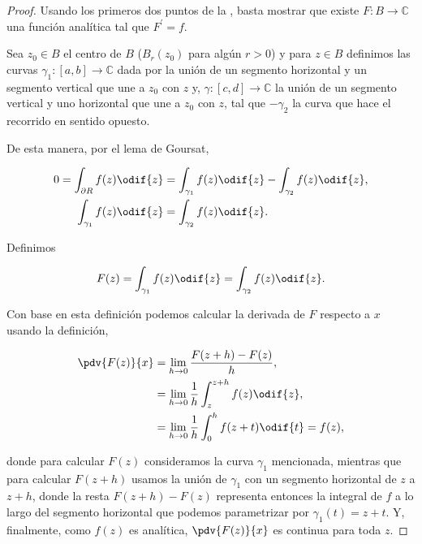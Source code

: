 \documentclass[../main.tex]{subfiles}
\begin{document}
\begin{proof}
    Usando los primeros dos puntos de la ,
    basta mostrar que
    existe \(F \colon B \to \mathbb{C}\) una función analítica tal que
    \(F^{\prime} = f\).

    Sea \(z_{0}\in  B\) el centro de \(B\) (\(B_{r}(z_{0})\) para algún \(r >
    0\)) y para
    \(z\in B\) definimos las curvas \(\gamma_{1} \colon [a, b] \to
    \mathbb{C}\) dada por la
    unión de un segmento horizontal y un segmento vertical que une a
    \(z_{0}\) con \(z\) y, \(\gamma \colon [c, d] \to
    \mathbb{C}\) la unión de un segmento vertical y uno horizontal que une a
    \(z_{0}\) con
    \(z\), tal que \(-\gamma_{2}\) la curva que hace el recorrido en sentido opuesto.

    De esta manera, por el lema de Goursat,

    \begin{align*}
        0 = \int_{\partial R}^{}f(z)\odif{z} &= \int_{\gamma_{1}}^{}f(z)\odif{z} -
        \int_{\gamma_{2}}^{}f(z)\odif{z},\\
        \int_{\gamma_{1}}^{}f(z)\odif{z} &= \int_{\gamma_{2}}^{}f(z)\odif{z}.
    \end{align*}

    Definimos

    \begin{equation*}
        F(z) = \int_{\gamma_{1}}^{}f(z)\odif{z} = \int_{\gamma_{2}}^{}f(z)\odif{z}.
    \end{equation*}

    Con base en esta definición podemos calcular la derivada de \(F\) respecto a \(x\)
    usando la definición,

    \begin{align*}
        \pdv{F(z)}{x} &= \lim_{h\to 0}\dfrac{F(z + h) - F(z)}{h},\\
        &= \lim_{h\to 0}\dfrac{1}{h}\int_{z}^{z + h}f(z)\odif{z},\\
        &= \lim_{h\to 0}\dfrac{1}{h}\int_{0}^{h}f(z + t)\odif{t} = f(z),
    \end{align*}

    donde para calcular \(F(z)\) consideramos la curva \(\gamma_{1}\)
    mencionada, mientras
    que para calcular \(F(z + h)\) usamos la unión de \(\gamma_{1}\) con un segmento
    horizontal de \(z\) a \(z + h\), donde la resta \(F(z + h) - F(z)\)
    representa entonces
    la integral de \(f\) a lo largo del segmento horizontal que podemos parametrizar por
    \(\gamma_{1}(t) = z + t\). Y, finalmente, como \(f(z)\) es analítica,
    \(\pdv{F(z)}{x}\)
    es continua para toda \(z\).


\end{proof}
\end{document}
